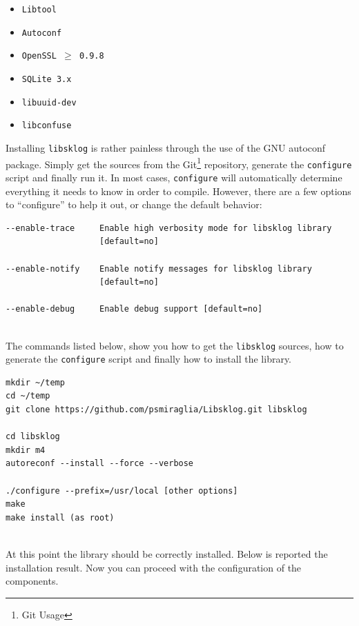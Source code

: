 \documentclass[a4paper,12pt]{article}
\def\libsklog{\texttt{libsklog}\xspace}
\begin{document}
\begin{itemize}
\item \texttt{Libtool}
\item \texttt{Autoconf}
\item \texttt{OpenSSL $\ge$ 0.9.8}
\item \texttt{SQLite 3.x}
\item \texttt{libuuid-dev}
\item \texttt{libconfuse}
\end{itemize}

Installing \libsklog is rather painless through the use of the GNU
autoconf package. Simply get the sources from the Git\footnote{Git
Usage} repository, generate the \texttt{configure} script and
finally run it. In most cases, \texttt{configure} will automatically
determine everything it needs to know in order to compile. However,
there are a few options to ``configure'' to help it out, or change
the default behavior:
\ \\
\begin{lstlisting}
--enable-trace     Enable high verbosity mode for libsklog library
                   [default=no]

--enable-notify    Enable notify messages for libsklog library
                   [default=no]

--enable-debug     Enable debug support [default=no]
\end{lstlisting}
\ \\
The commands listed below, show you how to get the \libsklog sources,
how to generate the \texttt{configure} script and finally how to install
the library.
\ \\
\begin{lstlisting}
mkdir ~/temp
cd ~/temp
git clone https://github.com/psmiraglia/Libsklog.git libsklog

cd libsklog
mkdir m4
autoreconf --install --force --verbose

./configure --prefix=/usr/local [other options]
make
make install (as root)
\end{lstlisting}
\ \\
At this point the library should be correctly installed. Below is
reported the installation result. Now you can proceed with the
configuration of the components.
\ \\
\end{document}
